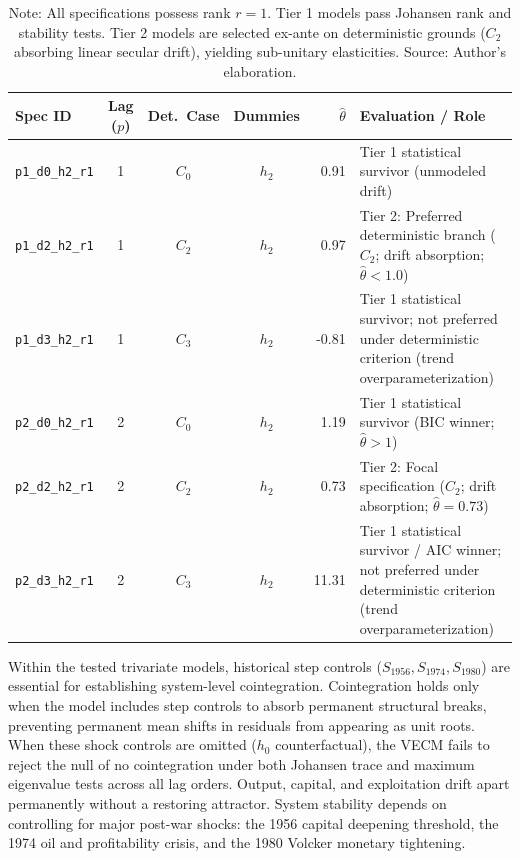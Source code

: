 \begin{table}[H]
\centering
\caption{S2 Retained Trivariate Specifications and Disposition Taxonomy}
\label{tab:s2_retained_trivariate_specs}
\footnotesize
\begin{tabular}{@{}>{\raggedright\arraybackslash}p{2.4cm}cccr>{\raggedright\arraybackslash}p{5.8cm}@{}}
\toprule
Spec ID & Lag ($p$) & Det.\ Case & Dummies & $\hat{\theta}$ & Evaluation / Role \\
\midrule
\midrule
\texttt{p1\_d0\_h2\_r1} & 1 & $C_0$ & $h_2$ & 0.91 & Tier 1 statistical survivor (unmodeled drift) \\
\texttt{p1\_d2\_h2\_r1} & 1 & $C_2$ & $h_2$ & 0.97 & Tier 2: Preferred deterministic branch ($C_2$; drift absorption; $\hat{\theta} < 1.0$) \\
\texttt{p1\_d3\_h2\_r1} & 1 & $C_3$ & $h_2$ & -0.81 & Tier 1 statistical survivor; not preferred under deterministic criterion (trend overparameterization) \\
\texttt{p2\_d0\_h2\_r1} & 2 & $C_0$ & $h_2$ & 1.19 & Tier 1 statistical survivor (BIC winner; $\hat{\theta} > 1$) \\
\texttt{p2\_d2\_h2\_r1} & 2 & $C_2$ & $h_2$ & 0.73 & Tier 2: Focal specification ($C_2$; drift absorption; $\hat{\theta} = 0.73$) \\
\texttt{p2\_d3\_h2\_r1} & 2 & $C_3$ & $h_2$ & 11.31 & Tier 1 statistical survivor / AIC winner; not preferred under deterministic criterion (trend overparameterization) \\
\bottomrule
\end{tabular}
\caption*{\footnotesize Note: All specifications possess rank $r=1$. Tier 1 models pass Johansen rank and stability tests. Tier 2 models are selected ex-ante on deterministic grounds ($C_2$ absorbing linear secular drift), yielding sub-unitary elasticities. Source: Author's elaboration.}
\end{table}

Within the tested trivariate models, historical step controls ($S_{1956}, S_{1974}, S_{1980}$) are essential for establishing system-level cointegration. Cointegration holds only when the model includes step controls to absorb permanent structural breaks, preventing permanent mean shifts in residuals from appearing as unit roots. When these shock controls are omitted ($h_0$ counterfactual), the VECM fails to reject the null of no cointegration under both Johansen trace and maximum eigenvalue tests across all lag orders. Output, capital, and exploitation drift apart permanently without a restoring attractor. System stability depends on controlling for major post-war shocks: the 1956 capital deepening threshold, the 1974 oil and profitability crisis, and the 1980 Volcker monetary tightening.

